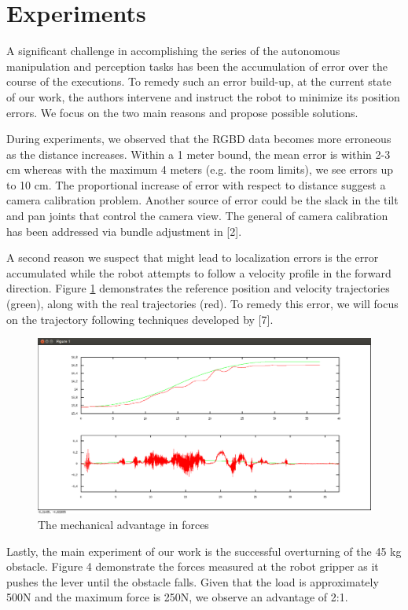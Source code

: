\documentclass{article}
\begin{document}
\section{Experiments}

A significant challenge in accomplishing the series of the autonomous manipulation and perception
tasks has been the accumulation of error over the course of the executions. To remedy such an error
build-up, at the current state of our work, the authors intervene and instruct the robot to minimize
its position errors. We focus on the two main reasons and propose possible solutions.

During experiments, we observed that the RGBD data becomes more erroneous as the distance increases.
Within a 1 meter bound, the mean error is within 2-3 cm whereas with the maximum 4 meters (e.g. the
room limits), we see errors up to 10 cm. The proportional increase of error with respect to distance
suggest a camera calibration problem. Another source of error could be the slack in the tilt and pan
joints that control the camera view. The general of camera calibration has been addressed via bundle
adjustment in [2].

A second reason we suspect that might lead to localization errors is the error accumulated while the
robot attempts to follow a velocity profile in the forward direction. Figure \ref{fig:controller} demonstrates the
reference position and velocity trajectories (green), along with the real trajectories (red). To
remedy this error, we will focus on the trajectory following techniques developed by [7].

\begin{figure}[ht!] 
  \centering
  \includegraphics[width=0.6\linewidth]{Figures/controller.png}
  \caption{The mechanical advantage in forces}
  \label{fig:controller}
\end{figure}

Lastly, the main experiment of our work is the successful overturning of the 45 kg obstacle. Figure
4 demonstrate the forces measured at the robot gripper as it pushes the lever until the obstacle
falls. Given that the load is approximately 500N and the maximum force is 250N, we observe an
advantage of 2:1.
\end{document}
